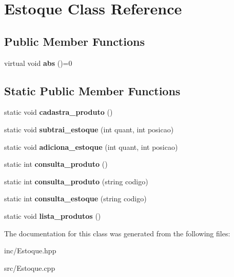 \hypertarget{class_estoque}{}\section{Estoque Class Reference}
\label{class_estoque}
\subsection*{Public Member Functions}
\begin{DoxyCompactItemize}
\item 
virtual void {\bfseries abs} ()=0\hypertarget{class_estoque_ae58fa5f0317c2906e547e8365ec0aaaf}{}\label{class_estoque_ae58fa5f0317c2906e547e8365ec0aaaf}

\end{DoxyCompactItemize}
\subsection*{Static Public Member Functions}
\begin{DoxyCompactItemize}
\item 
static void {\bfseries cadastra\+\_\+produto} ()\hypertarget{class_estoque_a924ac5184642311d4df82cb2bef65391}{}\label{class_estoque_a924ac5184642311d4df82cb2bef65391}

\item 
static void {\bfseries subtrai\+\_\+estoque} (int quant, int posicao)\hypertarget{class_estoque_a2480a2ed74f178c3b08eab98642b81c2}{}\label{class_estoque_a2480a2ed74f178c3b08eab98642b81c2}

\item 
static void {\bfseries adiciona\+\_\+estoque} (int quant, int posicao)\hypertarget{class_estoque_ac23c35a102fc43a0568011657f88df70}{}\label{class_estoque_ac23c35a102fc43a0568011657f88df70}

\item 
static int {\bfseries consulta\+\_\+produto} ()\hypertarget{class_estoque_a8a8e2cf8785baa09afe027f9f938412e}{}\label{class_estoque_a8a8e2cf8785baa09afe027f9f938412e}

\item 
static int {\bfseries consulta\+\_\+produto} (string codigo)\hypertarget{class_estoque_a6352218e6e3a9fbc4a16207bdaa45dc1}{}\label{class_estoque_a6352218e6e3a9fbc4a16207bdaa45dc1}

\item 
static int {\bfseries consulta\+\_\+estoque} (string codigo)\hypertarget{class_estoque_a69db1eed8754357bfb7df9f352e4fcaf}{}\label{class_estoque_a69db1eed8754357bfb7df9f352e4fcaf}

\item 
static void {\bfseries lista\+\_\+produtos} ()\hypertarget{class_estoque_ab538b63ace793abfe0d15eecbb8d4ae0}{}\label{class_estoque_ab538b63ace793abfe0d15eecbb8d4ae0}

\end{DoxyCompactItemize}


The documentation for this class was generated from the following files\+:\begin{DoxyCompactItemize}
\item 
inc/Estoque.\+hpp\item 
src/Estoque.\+cpp\end{DoxyCompactItemize}
